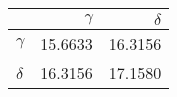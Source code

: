 \begin{tabular}{lrr}
\toprule
 & $\gamma$ & $\delta$ \\
\midrule
$\gamma$ & 15.6633 & 16.3156 \\
$\delta$ & 16.3156 & 17.1580 \\
\bottomrule
\end{tabular}
